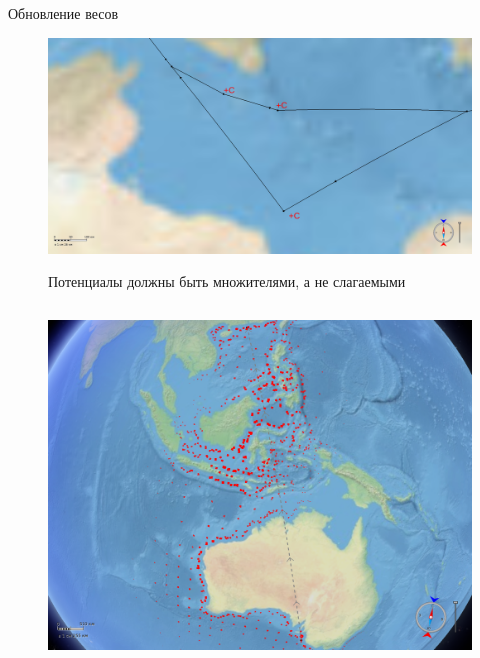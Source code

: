 \documentclass[russian, hyperref={unicode}]{beamer}
\begin{document}
\begin{frame}[noframenumbering]{Обновление весов}
     {
        \begin{figure}
            \includegraphics[width=\textwidth]{potentials-multipliers}

            Потенциалы должны быть множителями, а не слагаемыми
        \end{figure}
    }
 
     {
        \begin{columns}
            \begin{figure}
                \includegraphics[clip=true, trim = 280pt 0 20pt 0, width=\textwidth]{Solution/potentials-update/accum1}
            \end{figure}


\end{columns}}
\end{frame}
\end{document}
